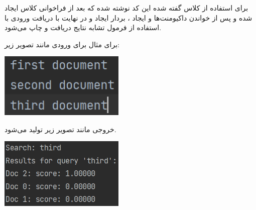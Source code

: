 \documentclass[12pt, dvipsnames, svgnames, x11names,]{article}
\begin{document}
		{\normalsize 
			برای استفاده از کلاس گفته شده این کد نوشته شده که بعد از فراخوانی کلاس ایجاد شده و پس از خواندن داکیومنت‌ها و ایجاد ، بردار  ایجاد و در نهایت با دریافت ورودی با استفاده از فرمول تشابه  نتایج دریافت و چاپ می‌شود.
		}		
	
		{\normalsize برای مثال برای ورودی مانند تصویر زیر:}
	
		\begin{center}
			{\includegraphics[width=6cm]{images/13.png}} \par
		\end{center}
	
		{\normalsize خروجی مانند تصویر زیر تولید می‌شود.}
	
		\begin{center}
			{\includegraphics[width=6cm]{images/14.png}} \par
		\end{center}
	
	
	
\end{document}
